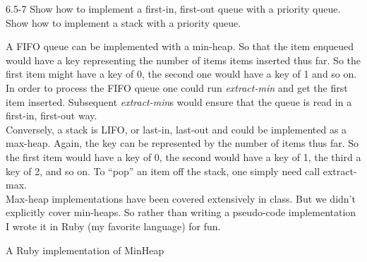 

\usepackage{listings}




\homeworkheader{\classnameandsection}

\begin{problem}{6.5-7}
  Show how to implement a first-in, first-out queue with a priority queue. Show how to implement a stack with
  a priority queue.

  \begin{solution}
    A FIFO queue can be implemented with a min-heap. So that the item enqueued would have a key representing
    the number of items items inserted thus far. So the first item might have a key of 0, the second one would have a key
    of 1 and so on. \\

    In order to process the FIFO queue one could run {\sl extract-min} and get the first item inserted.
    Subsequent {\sl extract-min}s would ensure that the queue is read in a first-in, first-out way. \\

    Conversely, a stack is LIFO, or last-in, last-out and could be implemented as a max-heap.
    Again, the key can be represented by the number of items thus far. So the first item would have a key of 0, the second
    would have a key of 1, the third a key of 2, and so on. To ``pop'' an item off the stack, one simply need
    call extract-max. \\

    Max-heap implementations have been covered extensively in class. But we didn't explicitly cover
    min-heaps. So rather than writing a pseudo-code implementation I wrote it in Ruby (my favorite language) for fun. \\

    \centerline{A Ruby implementation of MinHeap}
    
  \end{solution}
\end{problem}

